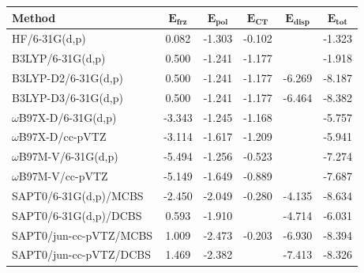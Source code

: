 \begin{table}[h]
  \centering
  \caption[Effect of empirical and self-consistent dispersion corrections in ALMO-EDA]{Effect of empirical and self-consistent dispersion corrections on ALMO-decomposed interaction energies with comparison to SAPT0. Values are weighted averages over the same \num{15} snapshots as in Table~\ref{paper_02:tab:6}. Energies are reported in \si{\kcal\per\mole}.}
  \label{paper_02:tab:S3}
  \begin{longtable}[]{@{}lccccc@{}}
    \toprule
    \textbf{Method} & \(\mathbf{E_{frz}}\) & \(\mathbf{E_{pol}}\) & \(\mathbf{E_{CT}}\) & \(\mathbf{E_{disp}}\) & \(\mathbf{E_{tot}}\)\tabularnewline
    \midrule
    \endhead
    HF/6-31G(d,p) & 0.082 & -1.303 & -0.102 & \textemdash{} & -1.323\tabularnewline
    B3LYP/6-31G(d,p) & 0.500 & -1.241 & -1.177 & \textemdash{} & -1.918\tabularnewline
    B3LYP-D2/6-31G(d,p) & 0.500 & -1.241 & -1.177 & -6.269 & -8.187\tabularnewline
    B3LYP-D3/6-31G(d,p) & 0.500 & -1.241 & -1.177 & -6.464 & -8.382\tabularnewline
    \(\omega\)B97X-D/6-31G(d,p) & -3.343 & -1.245 & -1.168 & \textemdash{} & -5.757\tabularnewline
    \(\omega\)B97X-D/cc-pVTZ & -3.114 & -1.617 & -1.209 & \textemdash{} & -5.941\tabularnewline
    \(\omega\)B97M-V/6-31G(d,p) & -5.494 & -1.256 & -0.523 & \textemdash{} & -7.274\tabularnewline
    \(\omega\)B97M-V/cc-pVTZ & -5.149 & -1.649 & -0.889 & \textemdash{} & -7.687\tabularnewline
    SAPT0/6-31G(d,p)/MCBS & -2.450 & -2.049 & -0.280 & -4.135 & -8.634\tabularnewline
    SAPT0/6-31G(d,p)/DCBS & 0.593 & -1.910 & & -4.714 & -6.031\tabularnewline
    SAPT0/jun-cc-pVTZ/MCBS & 1.009 & -2.473 & -0.203 & -6.930 & -8.394\tabularnewline
    SAPT0/jun-cc-pVTZ/DCBS & 1.469 & -2.382 & & -7.413 & -8.326\tabularnewline
    \bottomrule
  \end{longtable}
\end{table}

\section{}
\label{paper_02:sec:SIV}

